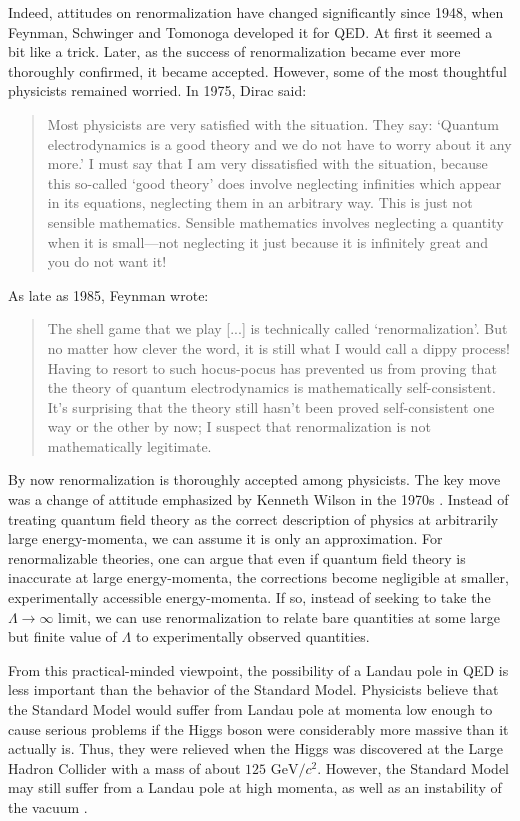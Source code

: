\documentclass[12pt]{article}
\begin{document}
Indeed, attitudes on renormalization have changed significantly since 1948, when Feynman, Schwinger and Tomonoga developed it for QED.   At first it seemed a bit like a trick.  Later, as the success of renormalization became ever more thoroughly confirmed, it became accepted.  However, some of the most thoughtful physicists remained worried.   In 1975, Dirac said:
\begin{quote}
Most physicists are very satisfied with the situation. They say: `Quantum electrodynamics is a good theory and we do not have to worry about it any more.' I must say that I am very dissatisfied with the situation, because this so-called `good theory' does involve neglecting infinities which appear in its equations, neglecting them in an arbitrary way. This is just not sensible mathematics. Sensible mathematics involves neglecting a quantity when it is small---not neglecting it just because it is infinitely great and you do not want it!
\end{quote}
As late as 1985, Feynman wrote:
\begin{quote}
The shell game that we play [...] is technically called `renormalization'. But no matter how clever the word, it is still what I would call a dippy process! Having to resort to such hocus-pocus has prevented us from proving that the theory of quantum electrodynamics is mathematically self-consistent. It's surprising that the theory still hasn't been proved self-consistent one way or the other by now; I suspect that renormalization is not mathematically legitimate.
\end{quote}
By now renormalization is thoroughly accepted among physicists.  The key move was a change of attitude emphasized by Kenneth Wilson in the 1970s \cite{WilsonKogut}.  Instead of treating quantum field theory as the correct description of physics at arbitrarily large energy-momenta, we can assume it is only an approximation.  For renormalizable theories, one can argue that even if quantum field theory is inaccurate at large energy-momenta, the corrections become negligible at smaller, experimentally accessible energy-momenta.   If so, instead of seeking to take the $\Lambda \to \infty$ limit, we can use renormalization to relate bare quantities at some large but finite value of $\Lambda$ to experimentally observed quantities.

From this practical-minded viewpoint, the possibility of a Landau pole in QED is less important than the behavior of the Standard Model.  Physicists believe that the Standard Model would suffer from Landau pole at momenta low enough to cause serious problems if the Higgs boson were considerably more massive than it actually is.  Thus, they were relieved when the Higgs was discovered at the Large Hadron Collider with a mass of about $125 \textrm{ GeV}/c^2$.  However, the Standard Model may still suffer from a Landau pole at high momenta, as well as an instability of the vacuum \cite{JKK}.  
\end{document}
